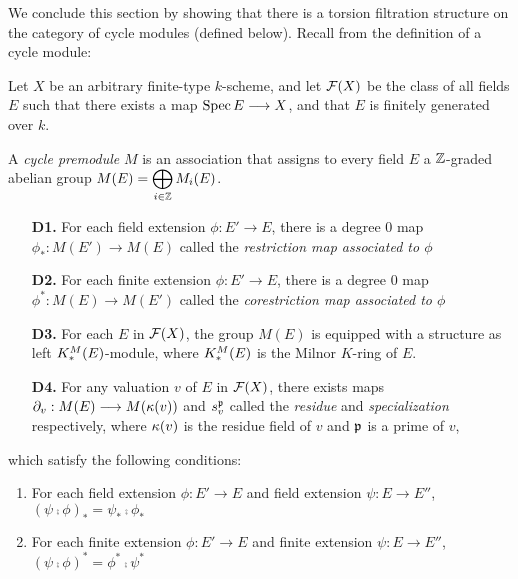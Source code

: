 We conclude this section by showing that there is a torsion 
filtration structure on the category of cycle modules (defined 
below). Recall from \cite{Rost96} the definition of a cycle 
module:

\begin{defn}\label{def_pre_cycmod}
Let $X$ be an arbitrary finite-type $k$-scheme, and let 
$\mathcal{F}(X)$ be the class of all fields $E$ such that there
exists a map $\mathrm{Spec}\, E \longrightarrow X$, and that $E$ is finitely generated
over $k$.

A \emph{cycle premodule} $M$ is an association that assigns to every
field $E$ a $\mathbb{Z}$-graded abelian group $\displaystyle M(E) =
\bigoplus_{i \in \mathbb{Z}} M_i(E)$.

\begin{enumerate}[label=\bfseries D\arabic*.]
\item[\textbf{D1.}] For each field extension $\phi: E' \to E$, 
there is a degree 0 map $\phi_*: M(E') \to M(E)$ called the 
\emph{restriction map associated to $\phi$}

\item[\textbf{D2.}] For each finite extension $\phi: E' \to E$, 
there is a degree 0 map $\phi^*: M(E) \to M(E')$ called the 
\emph{corestriction map associated to $\phi$}

\item[\textbf{D3.}] For each $E$ in $\mathcal{F}(X)$, the group $M(E)$ 
is equipped with a structure as left $K^M_*(E)$-module, where
$K^M_*(E)$ is the Milnor $K$-ring of $E$.

\item[\textbf{D4.}] For any valuation $v$ of $E$ in $\mathcal{F}(X)$, 
there exists maps $\partial_{v}: M(E) \longrightarrow M(\kappa(v))$ and 
$s_{v}^{\mathfrak{p}}$ called the \emph{residue} and 
\emph{specialization} respectively, where $\kappa(v)$ is the 
residue field of $v$ and $\mathfrak{p}$ is a prime of $v$,
\end{enumerate}

which satisfy the following conditions:

\begin{enumerate}[label=\bfseries R1\alph*., leftmargin=3em]
\item For each field extension $\phi: E' \to E$ and 
field extension $\psi: E \to E''$, $(\psi \comp \phi)_* = \psi_* 
\comp \phi_*$

\item For each finite extension $\phi: E' \to E$ and 
finite extension $\psi: E \to E''$, $(\psi \comp \phi)^* = \phi^* 
\comp \psi^*$


\end{enumerate}
\end{defn}
